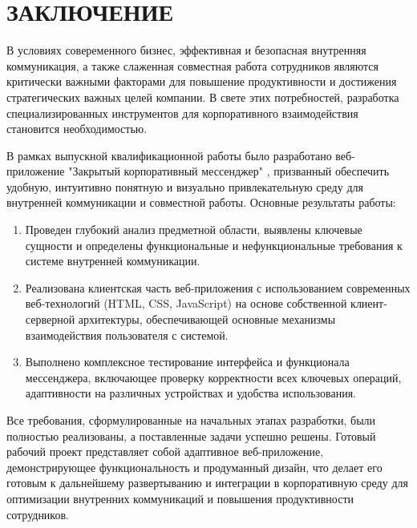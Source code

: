 \section*{ЗАКЛЮЧЕНИЕ}

В условиях совеременного бизнес, эффективная и безопасная внутренняя коммуникация, а также слаженная совместная работа сотрудников являются критически важными факторами для повышение продуктивности и достижения стратегических важных целей компании. В свете этих потребностей, разработка специализированных инструментов для корпоративного взаимодействия становится необходимостью.


В рамках выпускной квалификационной работы было разработано веб-приложение "Закрытый корпоративный мессенджер" , призванный обеспечить удобную, интуитивно понятную и визуально привлекательную среду для внутренней коммуникации и совместной работы.
Основные результаты работы:

\begin{enumerate}
\item Проведен глубокий анализ предметной области, выявлены ключевые сущности и определены функциональные и нефункциональные требования к системе внутренней коммуникации.
\item Реализована клиентская часть веб-приложения с использованием современных веб-технологий (HTML, CSS, JavaScript) на основе собственной клиент-серверной архитектуры, обеспечивающей основные механизмы взаимодействия пользователя с системой.
\item Выполнено комплексное тестирование интерфейса и функционала мессенджера, включающее проверку корректности всех ключевых операций, адаптивности на различных устройствах и удобства использования.
\end{enumerate}

Все требования, сформулированные на начальных этапах разработки, были полностью реализованы, а поставленные задачи успешно решены. Готовый рабочий проект представляет собой адаптивное веб-приложение, демонстрирующее функциональность и продуманный дизайн, что делает его готовым к дальнейшему развертыванию и интеграции в корпоративную среду для оптимизации внутренних коммуникаций и повышения продуктивности сотрудников.
